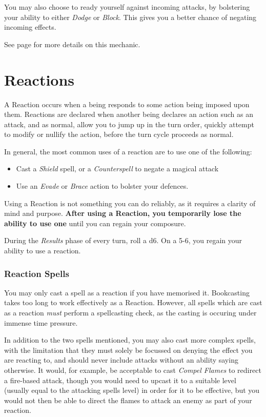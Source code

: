  You may also choose to ready yourself against incoming attacks, by bolstering your ability to either {\it Dodge} or {\it Block}. This gives you a better chance of negating incoming effects.  

See page \pageref{S:Accuracy} for more details on this mechanic. 

\section{Reactions} \label{S:Reactions}

A Reaction occurs when a being responds to some action being imposed upon them. Reactions are declared when another being declares an action such as an attack, and as normal, allow you to jump up in the turn order, quickly attempt to modify or nullify the action, before the turn cycle proceeds as normal. 

In general, the most common uses of a reaction are to use one of the following:

\begin{itemize}
	\item Cast a {\it Shield} spell, or a {\it Counterspell} to negate a magical attack
	\item Use an {\it Evade} or {\it Brace} action to bolster your defences. 
\end{itemize}

Using a Reaction is not something you can do reliably, as it requires a clarity of mind and purpose. {\bf After using a Reaction, you temporarily lose the ability to use one} until you can regain your composure. 

During the {\it Results} phase of every turn, roll a d6. On a 5-6, you regain your ability to use a reaction.

\subsubsection{Reaction Spells}

You may only cast a spell as a reaction if you have memorised it. Bookcasting takes too long to work effectively as a Reaction. However, all spells which are cast as a reaction {\it must} perform a spellcasting check, as the casting is occuring under immense time pressure. 

In addition to the two spells mentioned, you may also cast more complex spells, with the limitation that they must solely be focussed on denying the effect you are reacting to, and should never include attacks without an ability saying otherwise. It would, for example, be acceptable to cast {\it Compel Flames} to redirect a fire-based attack, though you would need to upcast it to a suitable level (usually equal to the attacking spell\apos{}s level) in order for it to be effective, but you would not then be able to direct the flames to attack an enemy as part of your reaction. 

